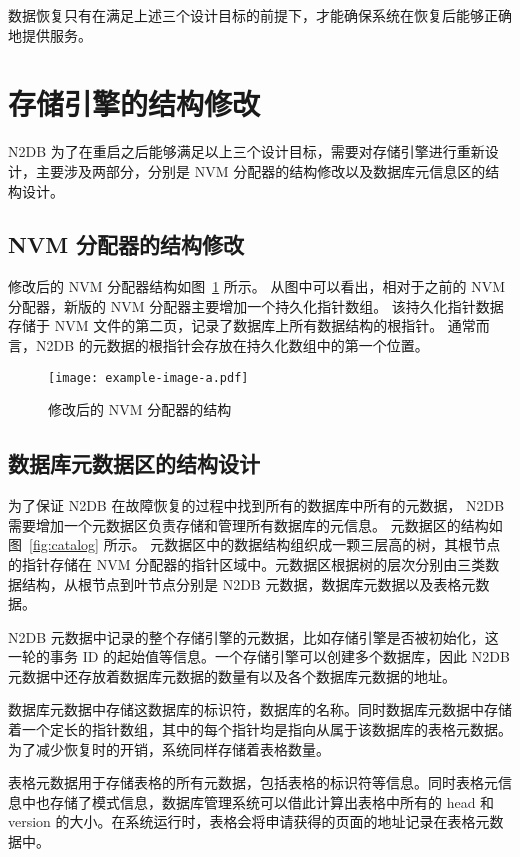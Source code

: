数据恢复只有在满足上述三个设计目标的前提下，才能确保系统在恢复后能够正确地提供服务。

\section{存储引擎的结构修改}

N2DB 为了在重启之后能够满足以上三个设计目标，需要对存储引擎进行重新设计，主要涉及两部分，分别是 NVM 分配器的结构修改以及数据库元信息区的结构设计。

\subsection{NVM 分配器的结构修改}
修改后的 NVM 分配器结构如图~\ref{fig:nvm-allocator} 所示。
从图中可以看出，相对于之前的 NVM 分配器，新版的 NVM 分配器主要增加一个持久化指针数组。
该持久化指针数据存储于 NVM 文件的第二页，记录了数据库上所有数据结构的根指针。
通常而言，N2DB 的元数据的根指针会存放在持久化数组中的第一个位置。

\begin{figure}[ht]
    \centering
    \texttt{[image: example-image-a.pdf]}
    \caption{修改后的 NVM 分配器的结构}
    \label{fig:nvm-allocator}
\end{figure}

\subsection{数据库元数据区的结构设计}

为了保证 N2DB 在故障恢复的过程中找到所有的数据库中所有的元数据， N2DB 需要增加一个元数据区负责存储和管理所有数据库的元信息。
元数据区的结构如图~\ref{fig:catalog} 所示。
元数据区中的数据结构组织成一颗三层高的树，其根节点的指针存储在 NVM 分配器的指针区域中。元数据区根据树的层次分别由三类数据结构，从根节点到叶节点分别是 N2DB 元数据，数据库元数据以及表格元数据。

N2DB 元数据中记录的整个存储引擎的元数据，比如存储引擎是否被初始化，这一轮的事务 ID 的起始值等信息。一个存储引擎可以创建多个数据库，因此 N2DB 元数据中还存放着数据库元数据的数量有以及各个数据库元数据的地址。

数据库元数据中存储这数据库的标识符，数据库的名称。同时数据库元数据中存储着一个定长的指针数组，其中的每个指针均是指向从属于该数据库的表格元数据。为了减少恢复时的开销，系统同样存储着表格数量。


表格元数据用于存储表格的所有元数据，包括表格的标识符等信息。同时表格元信息中也存储了模式信息，数据库管理系统可以借此计算出表格中所有的 head 和 version 的大小。在系统运行时，表格会将申请获得的页面的地址记录在表格元数据中。


